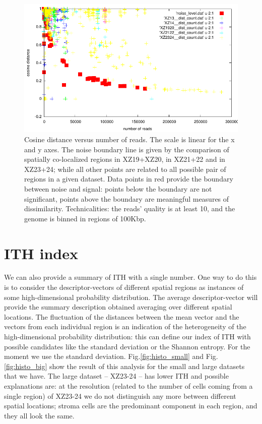 \documentclass[11pt,a4paper]{article}
\begin{document}
\begin{figure}[hbtp]
\centering
\includegraphics[scale=1]{intra_tumor_heterog__q10_res100k.pdf}
\caption{Cosine distance versus number of reads. The scale is linear for the x and y axes. The noise boundary line is given by the comparison of spatially co-localized regions in XZ19+XZ20, in XZ21+22 and in XZ23+24; while all other points are related to all possible pair of regions in a given dataset. Data points in red provide the boundary between noise and signal: points below the boundary are not significant, points above the boundary are meaningful measures of dissimilarity. Technicalities: the reads' quality is at least 10, and the genome is binned in regions of 100Kbp.}
\label{fig:intra_tumor_heterog__q10_res100k}
\end{figure}

\section{ITH index}
We can also provide a summary of ITH with a single number. One way to do this is to consider the descriptor-vectors of  different spatial regions as instances of some high-dimensional probability distribution. The average descriptor-vector will provide the summary description obtained averaging over different spatial locations. The fluctuation of the distances between the mean vector and the vectors from each individual region is an indication of the heterogeneity of the high-dimensional probability distribution: this can define our index of ITH with possible candidates like the standard deviation or the Shannon entropy. For the moment we use the standard deviation. Fig.\ref{fig:histo_small} and Fig.\ref{fig:histo_big} show the result of this analysis for the small and large datasets that we have. The large dataset -- XZ23-24 -- has lower ITH and possible explanations are: at the resolution (related to the number of cells coming from a single region) of XZ23-24 we do not distinguish any more between different spatial locations; stroma cells are the predominant component in each region, and they all look the same. 
		
\end{document}
